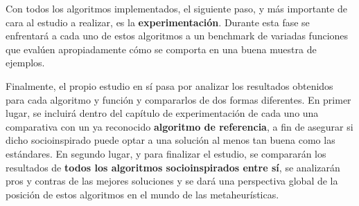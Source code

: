 Con todos los algoritmos implementados, el siguiente paso, y más importante de cara al estudio a realizar, es la \textbf{experimentación}. Durante esta fase se enfrentará a cada uno de estos algoritmos a un benchmark de variadas funciones que evalúen apropiadamente cómo se comporta en una buena muestra de ejemplos.

Finalmente, el propio estudio en sí pasa por analizar los resultados obtenidos para cada algoritmo y función y compararlos de dos formas diferentes. En primer lugar, se incluirá dentro del capítulo de experimentación de cada uno una comparativa con un ya reconocido \textbf{algoritmo de referencia}, a fin de asegurar si dicho socioinspirado puede optar a una solución al menos tan buena como las estándares. En segundo lugar, y para finalizar el estudio, se compararán los resultados de \textbf{todos los algoritmos socioinspirados entre sí}, se analizarán pros y contras de las mejores soluciones y se dará una perspectiva global de la posición de estos algoritmos en el mundo de las metaheurísticas.